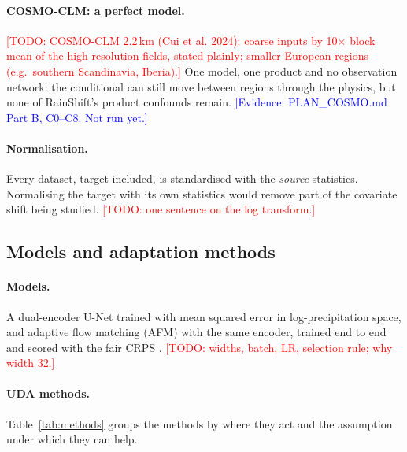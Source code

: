 \documentclass{article}
\newcommand{\todo}[1]{\textcolor{red}{[TODO: #1]}}
\newcommand{\ev}[1]{\textcolor{blue}{[Evidence: #1]}}
\begin{document}
\paragraph{COSMO-CLM: a perfect model.} \todo{COSMO-CLM 2.2\,km
(Cui et al. 2024); coarse inputs by 10$\times$ block mean of the
high-resolution fields, stated plainly; smaller European regions (e.g.\
southern Scandinavia, Iberia).} One model, one product and no observation
network: the conditional can still move between regions through the
physics, but none of RainShift's product confounds remain.
\ev{PLAN\_COSMO.md Part B, C0--C8. Not run yet.}

\paragraph{Normalisation.} Every dataset, target included, is
standardised with the \emph{source} statistics. Normalising the target
with its own statistics would remove part of the covariate shift being
studied. \todo{one sentence on the log transform.}

\subsection{Models and adaptation methods}\label{sec:methods}

\paragraph{Models.} A dual-encoder U-Net trained with mean squared error
in log-precipitation space, and adaptive flow matching (AFM)
\citep{fotiadis2025adaptive,lipman2023flow} with the same encoder, trained
end to end and scored with the fair CRPS
\citep{gneiting2007scoring,ferro2014fair}. \todo{widths, batch, LR,
selection rule; why width 32.}

\paragraph{UDA methods.} Table~\ref{tab:methods} groups the methods by
where they act and the assumption under which they can help.
\end{document}
